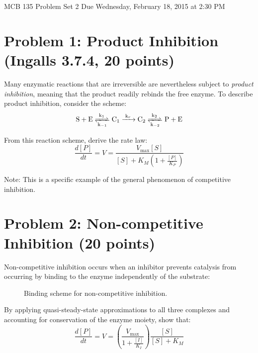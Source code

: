 \documentclass{article}
\begin{document}
\large

MCB 135 Problem Set 2 \hfill Due Wednesday, February 18, 2015 at 2:30 PM

\section*{Problem 1: Product Inhibition (Ingalls 3.7.4, 20 points)}

Many enzymatic reactions that are irreversible are nevertheless subject to \textit{product inhibition}, meaning that the product readily rebinds the free enzyme. To describe product inhibition, consider the scheme:
\begin{eqnarray*}
\ce{ S + E <=>[k_1][k_{-1}] \textrm{C}_1 ->[k_r] \textrm{C}_2  <=>[k_2][k_{-2}] P + E}
\end{eqnarray*}

From this reaction scheme, derive the rate law:
\[\frac{d\left[ P \right]}{dt} = V = \frac{V_{\textrm{max}} \left[ S \right]}{\left[ S \right] + K_M \left( 1 + \frac{\left[ P \right]}{K_P} \right)} \]

Note: This is a specific example of the general phenomenon of competitive inhibition.

\section*{Problem 2: Non-competitive Inhibition (20 points)}

Non-competitive inhibition occurs when an inhibitor prevents catalysis from occurring by binding to the enzyme independently of the substrate:

\begin{figure}[htp] 
\caption{Binding scheme for non-competitive inhibition.} \label{fig:noncompete}
\end{figure}  

By applying quasi-steady-state approximations to all three complexes and accounting for conservation of the enzyme moiety, show that:
\[\frac{d\left[ P \right]}{dt} = V = \left( \frac{V_{\textrm{max}}}{1 + \frac{\left[ I \right]}{K_I}} \right) \frac{\left[ S \right]}{\left[ S \right] + K_M } \]
\end{document}
